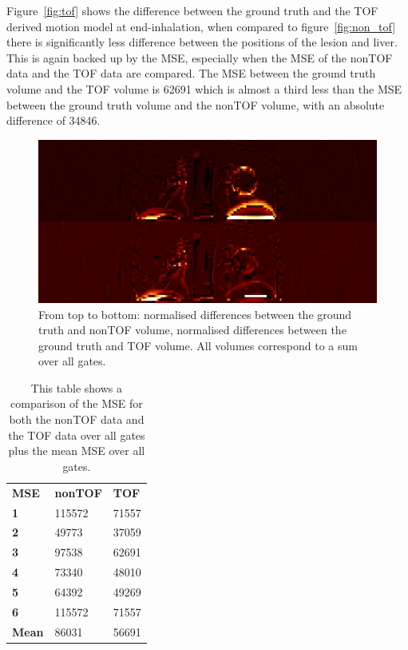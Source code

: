 \documentclass[9pt]{IEEEtran}
\begin{document}
Figure~\ref{fig:tof} shows the difference between the ground truth and the TOF derived motion model at end-inhalation, when compared to figure~\ref{fig:non_tof} there is significantly less difference between the positions of the lesion and liver. This is again backed up by the MSE, especially when the MSE of the nonTOF data and the TOF data are compared. The MSE between the ground truth volume and the TOF volume is 62691 which is almost a third less than the MSE between the ground truth volume and the nonTOF volume, with an absolute difference of 34846.

\begin{figure}
    \centering
    \includegraphics[scale=0.3]{figures/sum.png}
    \caption{From top to bottom: normalised differences between the ground truth and nonTOF volume, normalised differences between the ground truth and TOF volume. All volumes correspond to a sum over all gates.}
    \label{fig:sum}
\end{figure}

\begin{table}
    \centering
    \begin{tabular}{lll}
        \textbf{MSE}  & \textbf{nonTOF} & \textbf{TOF} \\
        \textbf{1}    & 115572          & 71557        \\
        \textbf{2}    & 49773           & 37059        \\
        \textbf{3}    & 97538           & 62691        \\
        \textbf{4}    & 73340           & 48010        \\
        \textbf{5}    & 64392           & 49269        \\
        \textbf{6}    & 115572          & 71557        \\
        \textbf{Mean} & 86031           & 56691       
    \end{tabular}
    \caption{This table shows a comparison of the MSE for both the nonTOF data and the TOF data over all gates plus the mean MSE over all gates.}
    \label{tab:mse}
\end{table}
\end{document}
